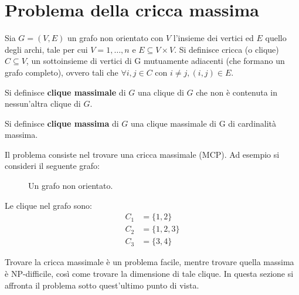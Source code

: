 \newpage

\section{Problema della cricca massima} %
\label{sec:problema_della_cricca_massima}

Sia $G=(V,E)$ un grafo non orientato con $V$ l'insieme dei vertici ed $E$ quello degli archi, tale per cui $V={1,\dots,n}$ e $E \subseteq V \times V$. Si definisce cricca (o clique) $C \subseteq V$, un sottoinsieme di vertici di G mutuamente adiacenti (che formano un grafo completo), ovvero tali che $\forall i,j \in C$ con $i \neq j, (i,j) \in E$.

\begin{mydef}
Si definisce \textbf{clique massimale} di $G$ una clique di $G$ che non è contenuta in nessun'altra clique di $G$.    
\end{mydef}

\begin{mydef}
    Si definisce \textbf{clique massima} di $G$ una clique massimale di G di cardinalità massima.
\end{mydef}
Il problema consiste nel trovare una cricca massimale (MCP). Ad esempio si consideri il seguente grafo:

\begin{figure}[h!]
    \centering
    \caption{Un grafo non orientato.}\label{fig:graph1}
\end{figure}
Le clique nel grafo sono:
\begin{align*}
    C_1 &= \{1,2\} \tag{$C_1$ non è massimale perché $C_1 \subseteq C_2$}\\
    C_2 &= \{1,2,3\} \tag{Massimale e massima}\\
    C_3 &= \{3,4\} \tag{Massimale}
\end{align*}

\newpage

Trovare la cricca massimale è un problema facile, mentre trovare quella massima è NP-difficile, così come trovare la dimensione di tale clique. In questa sezione si affronta il problema sotto quest'ultimo punto di vista.

